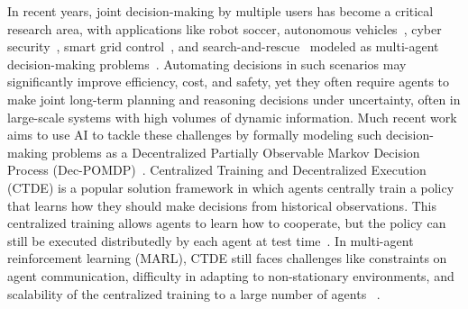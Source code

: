 In recent years, joint decision-making by multiple users has become a critical research area, with applications like robot soccer, autonomous vehicles~\cite{6303906}, cyber security~\cite{chen2023explainable,chen2023ride}, smart grid control~\cite{4840087}, and search-and-rescue~\cite{10.5555/646288.686470} modeled as multi-agent decision-making problems~\cite{chen2021bringing,chen2024rgmdt}. Automating decisions in such scenarios may significantly improve efficiency, cost, and safety, yet they often require agents to make joint long-term planning and reasoning decisions under uncertainty, often in large-scale systems with high volumes of dynamic information.
Much recent work aims to use AI to tackle these challenges by formally modeling such decision-making problems as a Decentralized Partially Observable Markov Decision Process (Dec-POMDP)~\cite{bernstein2002complexity}. Centralized Training and Decentralized Execution (CTDE) is a popular solution framework in which agents centrally train a policy that learns how they should make decisions from historical observations. This centralized training allows agents to learn how to cooperate, but the policy can still be executed distributedly by each agent at test time~\cite{maddpg,li2022pmic,chen2024rgmcomm}. In multi-agent reinforcement learning (MARL), 
CTDE still faces challenges like constraints on agent communication, difficulty in adapting to non-stationary environments, and scalability of the centralized training to a large number of agents
~\cite{huh2023multi}.



